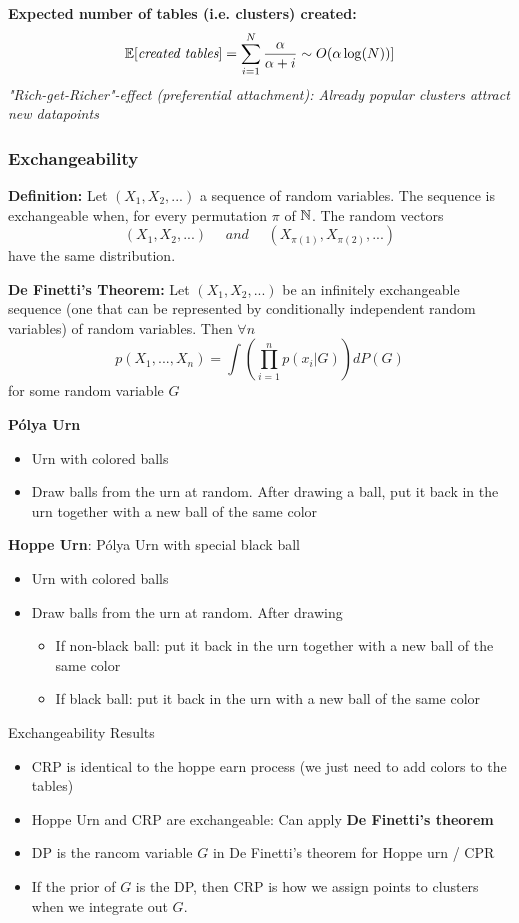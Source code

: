 \textbf{Expected number of tables (i.e. clusters) created: }
$$
	\mathbb E[\textit{created tables}] = \sum_{i = 1}^{N}\frac{\alpha}{\alpha + i} \sim O(\alpha\log(N)) ]
$$
\textit{"Rich-get-Richer"-effect (preferential attachment): Already popular clusters attract new datapoints}
\subsubsection{Exchangeability}
\textbf{Definition: } Let $(X_1, X_2, ...)$ a sequence of random variables. The sequence is exchangeable when, for every permutation $\pi$ of $\mathbb N$. The random vectors
$$
	(X_1, X_2, ...) \quad \textit{ and } \quad (X_{\pi(1)}, X_{\pi(2)}, ...)
$$
have the same distribution.

\textbf{De Finetti's Theorem: } Let $(X_1, X_2, ...)$ be an infinitely exchangeable sequence (one that can be represented by conditionally independent random variables) of random variables. Then $\forall n$
$$
	p(X_1, ..., X_n) = \int \left(\prod_{i = 1}^n p(x_i|G)\right) dP(G)
$$
for some random variable $G$


\textbf{P\'{o}lya Urn}
\begin{itemize}
	\item Urn with colored balls
	\item Draw balls from the urn at random. After drawing a ball, put it back in the urn together with a new ball of the same color
\end{itemize}

\textbf{Hoppe Urn}: P\'{o}lya Urn with special black ball
\begin{itemize}
	\item Urn with colored balls
	\item Draw balls from the urn at random. After drawing 
	\begin{itemize}
		\item If non-black ball: put it back in the urn together with a new ball of the same color
		\item If black ball: put it back in the urn with a new ball of the same color
	\end{itemize}
\end{itemize}

\begin{highlight}{Exchangeability Results}
\begin{itemize}
	\item CRP is identical to the hoppe earn process (we just need to add colors to the tables)
	\item Hoppe Urn and CRP are exchangeable: Can apply \textbf{De Finetti's theorem}
	\item DP is the rancom variable $G$ in De Finetti's theorem for Hoppe urn / CPR
	\item If the prior of $G$ is the DP, then CRP is how we assign points to clusters when we integrate out $G$.
\end{itemize}
\end{highlight}
